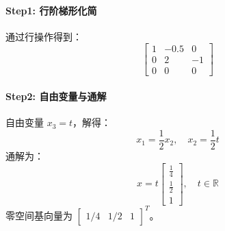 \paragraph{Step1: 行阶梯形化简}  
通过行操作得到：
\[
\begin{bmatrix}
1 & -0.5 & 0 \\
0 & 2 & -1 \\
0 & 0 & 0
\end{bmatrix}
\]

\paragraph{Step2: 自由变量与通解}  
自由变量 \(x_3 = t\)，解得：
\[
x_1 = \frac{1}{2}x_2, \quad x_2 = \frac{1}{2}t
\]
通解为：
\[
x = t \begin{bmatrix}
\frac{1}{4} \\ \frac{1}{2} \\ 1
\end{bmatrix}, \quad t \in \mathbb{R}
\]
零空间基向量为 \(\begin{bmatrix} 1/4 & 1/2 & 1 \end{bmatrix}^T\)。